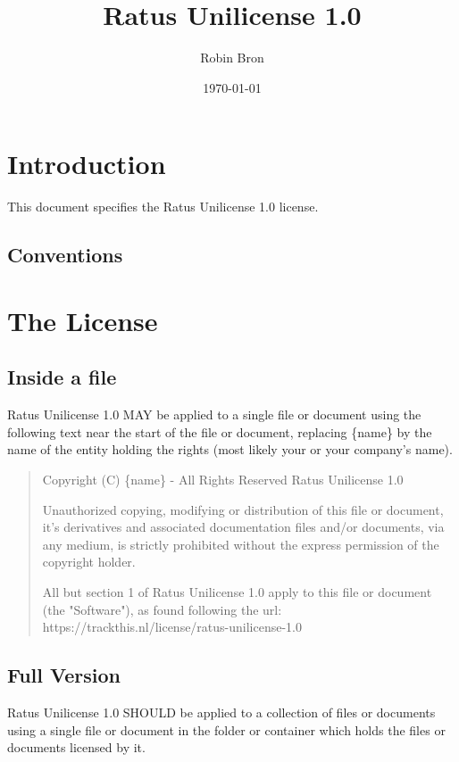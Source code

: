\documentclass[a4paper,12pt]{article}
\begin{document}
\title{Ratus Unilicense 1.0}
\author{Robin Bron}
\date{\today}
\maketitle

\vfill

\newpage
\tableofcontents
\newpage


\section{Introduction}
  This document specifies the Ratus Unilicense 1.0 license.

\subsection{Conventions}


\newpage
\section{The License}

\subsection{Inside a file}
  Ratus Unilicense 1.0 MAY be applied to a single file or document using the
  following text near the start of the file or document, replacing \{name\} by
  the name of the entity holding the rights (most likely your or your company's
  name).

  \begin{quote}
    Copyright (C) \{name\} - All Rights Reserved\newline
    Ratus Unilicense 1.0

    Unauthorized copying, modifying or distribution of this file or document,
    it's derivatives and associated documentation files and/or documents, via
    any medium, is strictly prohibited without the express permission of the
    copyright holder.

    All but section 1 of Ratus Unilicense 1.0 apply to this file or
    document (the "Software"), as found following the url:
    https://trackthis.nl/license/ratus-unilicense-1.0
  \end{quote}

\newpage
\subsection{Full Version}
  Ratus Unilicense 1.0 SHOULD be applied to a collection of files or documents
  using a single  file or document in the folder or container
  which holds the files or documents licensed by it.
\end{document}
